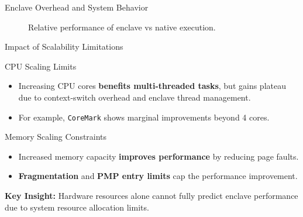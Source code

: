 \documentclass[aspectratio=169]{beamer}
\begin{document}
\begin{frame}{Enclave Overhead and System Behavior}
{\begin{figure}[htbp]
\caption{Relative performance of enclave vs native execution.}
\end{figure}
}
\end{frame}

\begin{frame}{Impact of Scalability Limitations}
\small
\begin{block}{CPU Scaling Limits}
\begin{itemize}
    \item Increasing CPU cores \textbf{benefits multi-threaded tasks}, but gains plateau due to context-switch overhead and enclave thread management.
    \item For example, \texttt{CoreMark} shows marginal improvements beyond 4 cores.
\end{itemize}
\end{block}

\begin{block}{Memory Scaling Constraints}
\begin{itemize}
    \item Increased memory capacity \textbf{improves performance} by reducing page faults.
    \item \textbf{Fragmentation} and \textbf{PMP entry limits} cap the performance improvement.
\end{itemize}
\end{block}

\centering
\textbf{Key Insight:} Hardware resources alone cannot fully predict enclave performance due to system resource allocation limits.
\end{frame}
\end{document}
